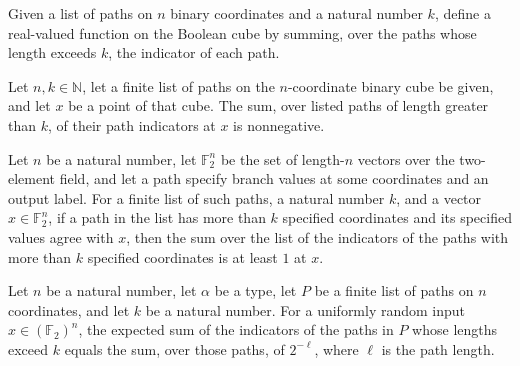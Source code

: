 \begin{definition}
\leanok
{}
Given a list of paths on $n$ binary coordinates and a natural number $k$, define a
real-valued function on the Boolean cube by summing, over the paths whose length exceeds
$k$, the indicator of each path.
\end{definition}

\begin{theorem}
\leanok
{}
Let $n,k\in\mathbb N$, let a finite list of paths on the $n$-coordinate binary cube be
given, and let $x$ be a point of that cube. The sum, over listed paths of length greater
than $k$, of their path indicators at $x$ is nonnegative.
\end{theorem}

\begin{theorem}
\leanok
{}
Let $n$ be a natural number, let $\mathbb F_2^n$ be the set of length-$n$ vectors over
the two-element field, and let a path specify branch values at some coordinates and an
output label. For a finite list of such paths, a natural number $k$, and a vector
$x\in\mathbb F_2^n$, if a path in the list has more than $k$ specified coordinates and
its specified values agree with $x$, then the sum over the list of the indicators of the
paths with more than $k$ specified coordinates is at least $1$ at $x$.
\end{theorem}

\begin{theorem}
\leanok
{}
Let $n$ be a natural number, let $\alpha$ be a type, let $P$ be a finite list of paths
on $n$ coordinates, and let $k$ be a natural number. For a uniformly random input
$x\in(\mathbb{F}_2)^n$, the expected sum of the indicators of the paths in $P$ whose
lengths exceed $k$ equals the sum, over those paths, of $2^{-\ell}$, where $\ell$ is the
path length.
\end{theorem}

